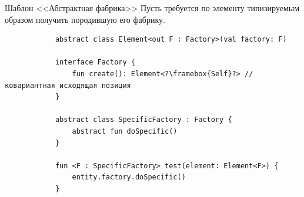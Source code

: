 \documentclass[usenames, dvipsnames]{beamer}
\begin{document}
    \begin{frame}[fragile]{Шаблон <<Абстрактная фабрика>>}
        Пусть требуется по элементу типизируемым образом получить породившую его фабрику.

        \begin{verbatim}
            abstract class Element<out F : Factory>(val factory: F)

            interface Factory {
                fun create(): Element<?\framebox{Self}?> // ковариантная исходящая позиция
            }

            abstract class SpecificFactory : Factory {
                abstract fun doSpecific()
            }

            fun <F : SpecificFactory> test(element: Element<F>) {
                entity.factory.doSpecific()
            }
        \end{verbatim}
    \end{frame}
\end{document}
